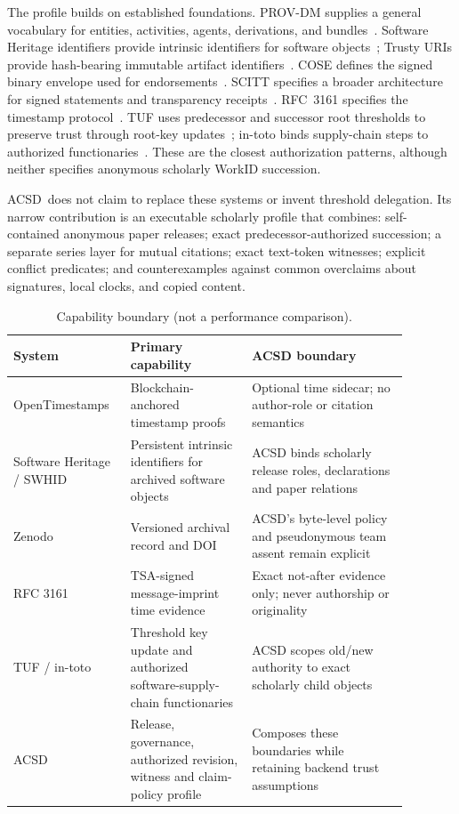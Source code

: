 \documentclass[11pt]{article}
\newcommand{\acsd}{\textsc{ACSD}}
\begin{document}
The profile builds on established foundations. PROV-DM supplies a general vocabulary for entities, activities, agents, derivations, and bundles~\cite{prov}. Software Heritage identifiers provide intrinsic identifiers for software objects~\cite{swhid}; Trusty URIs provide hash-bearing immutable artifact identifiers~\cite{trusty}. COSE defines the signed binary envelope used for endorsements~\cite{cose}. SCITT specifies a broader architecture for signed statements and transparency receipts~\cite{scitt}. RFC~3161 specifies the timestamp protocol~\cite{rfc3161}. TUF uses predecessor and successor root thresholds to preserve trust through root-key updates~\cite{tufspec}; in-toto binds supply-chain steps to authorized functionaries~\cite{intoto}. These are the closest authorization patterns, although neither specifies anonymous scholarly WorkID succession.

\acsd\ does not claim to replace these systems or invent threshold delegation. Its narrow contribution is an executable scholarly profile that combines: self-contained anonymous paper releases; exact predecessor-authorized succession; a separate series layer for mutual citations; exact text-token witnesses; explicit conflict predicates; and counterexamples against common overclaims about signatures, local clocks, and copied content.

\begin{table}[H]
\centering
\caption{Capability boundary (not a performance comparison).}
\begin{tabular}{p{0.23\linewidth}p{0.29\linewidth}p{0.36\linewidth}}
\toprule
System & Primary capability & ACSD boundary \\
\midrule
OpenTimestamps & Blockchain-anchored timestamp proofs & Optional time sidecar; no author-role or citation semantics \\
Software Heritage / SWHID & Persistent intrinsic identifiers for archived software objects & ACSD binds scholarly release roles, declarations and paper relations \\
Zenodo & Versioned archival record and DOI & ACSD's byte-level policy and pseudonymous team assent remain explicit \\
RFC 3161 & TSA-signed message-imprint time evidence & Exact not-after evidence only; never authorship or originality \\
TUF / in-toto & Threshold key update and authorized software-supply-chain functionaries & ACSD scopes old/new authority to exact scholarly child objects \\
ACSD & Release, governance, authorized revision, witness and claim-policy profile & Composes these boundaries while retaining backend trust assumptions \\
\bottomrule
\end{tabular}
\end{table}
\end{document}
